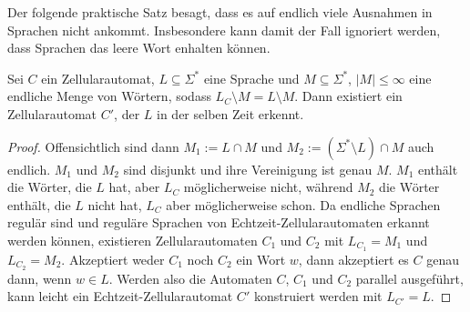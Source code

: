 Der folgende praktische Satz besagt, dass es auf endlich viele Ausnahmen in Sprachen nicht ankommt.
Insbesondere kann damit der Fall ignoriert werden, dass Sprachen das leere Wort enhalten können.
\begin{satz}
    \label{endlichVieleAusnahmen}
    Sei $C$ ein Zellularautomat,
    $L \subseteq \Sigma^*$ eine Sprache und $M \subseteq \Sigma^*$, $|M| \leq \infty$  eine endliche Menge von Wörtern, sodass $L_C \setminus M = L \setminus M$.
    Dann existiert ein Zellularautomat $C'$, der $L$ in der selben Zeit erkennt.
\end{satz}
\begin{proof}
    Offensichtlich sind dann $M_1 := L \cap M$ und $M_2 := (\Sigma^* \setminus L) \cap M$ auch endlich.
    $M_1$ und $M_2$ sind disjunkt und ihre Vereinigung ist genau $M$.
    $M_1$ enthält die Wörter, die $L$ hat, aber $L_C$ möglicherweise nicht, während $M_2$ die Wörter enthält, die $L$ nicht hat, $L_C$ aber möglicherweise schon.
    Da endliche Sprachen regulär sind und reguläre Sprachen von Echtzeit-Zellularautomaten erkannt werden können,
    existieren Zellularautomaten $C_1$ und $C_2$ mit $L_{C_1} = M_1$ und $L_{C_2} = M_2$.
    Akzeptiert weder $C_1$ noch $C_2$ ein Wort $w$, dann akzeptiert es $C$ genau dann, wenn $w \in L$.
    Werden also die Automaten $C$, $C_1$ und $C_2$ parallel ausgeführt, kann leicht ein Echtzeit-Zellularautomat $C'$ konstruiert werden mit $L_{C'} = L$.
\end{proof}